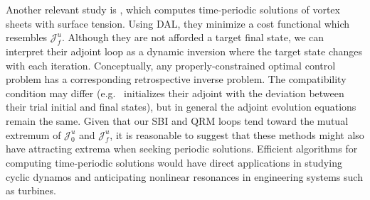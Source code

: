 \documentclass[%
 reprint,
 amsmath,amssymb,
 aps,
 pre,
]{revtex4-2}
\newcommand{\Juo}{\mathcal{J}^{u}_0}
\newcommand{\Juf}{\mathcal{J}^{u}_f}
\begin{document}
Another relevant study is \cite{Ambrose2015}, which computes time-periodic solutions of vortex sheets with surface tension.
Using DAL, they minimize a cost functional which resembles $\Juf$.
Although they are not afforded a target final state, we can interpret their adjoint loop as a dynamic inversion where the target state changes with each iteration.
Conceptually, any properly-constrained optimal control problem has a corresponding retrospective inverse problem.
The compatibility condition may differ (e.g.~\cite{Ambrose2015} initializes their adjoint with the deviation between their trial initial and final states), but in general the adjoint evolution equations remain the same.
Given that our SBI and QRM loops tend toward the mutual extremum of $\Juo$ and $\Juf$, it is reasonable to suggest that these methods might also have attracting extrema when seeking periodic solutions.
Efficient algorithms for computing time-periodic solutions would have direct applications in studying cyclic dynamos and anticipating nonlinear resonances in engineering systems such as turbines.


\end{document}
